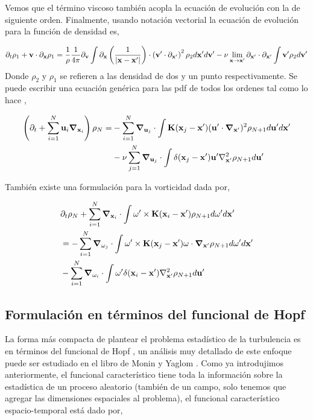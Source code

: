 \documentclass[executivepaper,12pt]{article}
\numberwithin{equation}{section}
\providecommand{\abs}[1]{\lvert#1\rvert}
\begin{document}
Vemos que el término viscoso también acopla la ecuación de evolución con la de siguiente orden. Finalmente, usando notación vectorial la ecuación de evolución para la función de densidad es,

\begin{equation*}
	\partial_t \rho_1 +\vb{v}\cdot \partial_{\vb{x}}\rho_1=\frac{1}{\rho}\frac{1}{4\pi}\partial_{\vb{v}}\int \partial_{\vb{x}}\left(\frac{1}{\abs{\vb{x}-\vb{x}'}}\right)\cdot\left(\vb{v}'\cdot\partial_{\vb{x}'}\right)^2\rho_2d\vb{x}'d\vb{v}'-\nu\lim_{\vb{x}\to \vb{x}'}\partial_{\vb{x}'}\cdot\partial_{\vb{x}'}\int \vb{v}'\rho_2 d\vb{v}'
\end{equation*}
Donde $\rho_2$ y $\rho_1$ se refieren a las densidad de dos y un punto respectivamente. Se puede escribir una ecuación genérica para las pdf de todos los ordenes tal como lo hace \parencite{friedrich2012}, 

\begin{align*}
	\left(\partial_t +\sum_{i=1}^N \vb{u}_i \grad{}_{\vb{x}_i}\right)\rho_N=&-\sum_{i=1}^N\grad{}_{\vb{u}_j}\cdot\int \vb{K}(\vb{x}_j-\vb{x}')(\vb{u}'\cdot\grad{}_{\vb{x}'})^2 \rho_{N+1} d\vb{u'} d\vb{x}'\\
	&-\nu\sum_{j=1}^{N}\grad{}_{\vb{u}_j}\cdot\int\delta(\vb{x}_j-\vb{x}')\vb{u}'\nabla^2_{\vb{x}'}\rho_{N+1}d\vb{u}'
\end{align*}

También existe una formulación para la vorticidad dada por,


\begin{align*}
	&\partial_t\rho_N +\sum_{i=1}^N \grad{}_{\vb{x}_i}\cdot \int  \vb{\omega}' \times \vb{K}(\vb{x}_i-\vb{x}')\rho_{N+1}  d\vb{\omega}' d\vb{x}' \\
	&=-\sum_{i=1}^N\grad{}_{\vb{\omega}_j}\cdot\int \vb{\omega}'\times\vb{K}(\vb{x}_j-\vb{x}')\vb{\omega}\cdot\grad{}_{\vb{x}'} \rho_{N+1} d\vb{\omega'} d\vb{x}'\\
	&-\sum_{i=1}^{N}\grad{}_{\vb{\omega}_i}\cdot\int\vb{\omega}'\delta(\vb{x}_i-\vb{x}')\nabla^2_{\vb{x}'}\rho_{N+1}d\vb{u}'
\end{align*}

\subsection{Formulación en términos del funcional de Hopf}

La forma más compacta de plantear el problema estadístico de la turbulencia es en términos del funcional de Hopf \parencite{hopf1952}, un análisis muy detallado de este enfoque puede ser estudiado en el libro de Monin y Yaglom \parencite{monin1976}. Como ya introdujimos anteriormente, el funcional característico tiene toda la información sobre la estadística de un proceso aleatorio (también de un campo, solo tenemos que agregar las dimensiones espaciales al problema), el funcional característico espacio-temporal está dado por,
\end{document}
